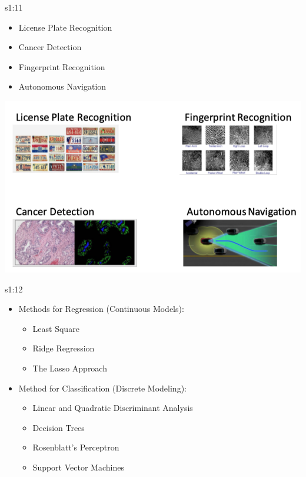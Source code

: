 \documentclass{tron}
\begin{document}
\begin{remark}{s1:11}
	\begin{itemize}
		\item License Plate Recognition
		\item Cancer Detection
		\item Fingerprint Recognition
		\item Autonomous Navigation
	\end{itemize}
	\begin{center}
		\includegraphics[width=0.6\columnwidth]{Figs/Slide2/app.png}		
	\end{center}
\end{remark}
\begin{algo}{s1:12}
	\begin{itemize}
		\item Methods for Regression (Continuous Models):
		\vspace{-5pt}
			\begin{itemize}
				\item Least Square
				\item Ridge Regression
				\item The Lasso Approach
			\end{itemize}
		\item Method for Classification (Discrete Modeling):
		\vspace{-5pt}
			\begin{itemize}
				\item Linear and Quadratic Discriminant Analysis
				\item Decision Trees
				\item Rosenblatt's Perceptron
				\item Support Vector Machines
			\end{itemize}
	\end{itemize}
\end{algo}
\end{document}
